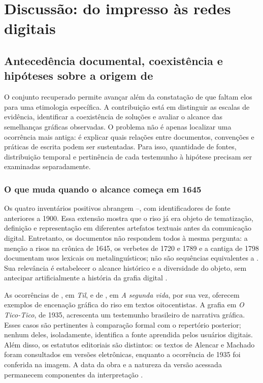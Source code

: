 \section{Discussão: do impresso às redes digitais}
\subsection{Antecedência documental, coexistência e hipóteses sobre a origem de }
\label{sec:discussion-origin}

O conjunto recuperado permite avançar além da constatação de que faltam elos para uma etimologia específica. A contribuição está em distinguir as escalas de evidência, identificar a coexistência de soluções e avaliar o alcance das semelhanças gráficas observadas. O problema não é apenas localizar uma ocorrência mais antiga: é explicar quais relações entre documentos, convenções e práticas de escrita podem ser sustentadas. Para isso, quantidade de fontes, distribuição temporal e pertinência de cada testemunho à hipótese precisam ser examinadas separadamente.

\subsubsection{O que muda quando o alcance começa em 1645}
Os quatro inventários positivos abrangem \SelectedMinYear{}--\SelectedMaxYear{}, com \PreNineteenSources{} identificadores de fonte anteriores a 1900. Essa extensão mostra que o riso já era objeto de tematização, definição e representação em diferentes artefatos textuais antes da comunicação digital. Entretanto, os documentos não respondem todos à mesma pergunta: a menção a risos na crônica de 1645, os verbetes de 1720 e 1789 e a cantiga de 1798 documentam usos lexicais ou metalinguísticos; não são sequências equivalentes a . Sua relevância é estabelecer o alcance histórico e a diversidade do objeto, sem antecipar artificialmente a história da grafia digital \cite{r4chronicacompanhiaiesvportugal,r4vocabularioportuguezlatino,r4diccionariolinguaportuguezamorais,r4violadelereno}.

As ocorrências de , em \textit{Til}, e de , em \textit{A segunda vida}, por sua vez, oferecem exemplos de encenação gráfica do riso em textos oitocentistas. A grafia  em \textit{O Tico-Tico}, de 1935, acrescenta um testemunho brasileiro de narrativa gráfica. Esses casos são pertinentes à comparação formal com o repertório posterior; nenhum deles, isoladamente, identifica a fonte aprendida pelos usuários digitais. Além disso, os estatutos editoriais são distintos: os textos de Alencar e Machado foram consultados em versões eletrônicas, enquanto a ocorrência de 1935 foi conferida na imagem. A data da obra e a natureza da versão acessada permanecem componentes da interpretação \cite{alencar1872,assis1884,ticotico1935}.


